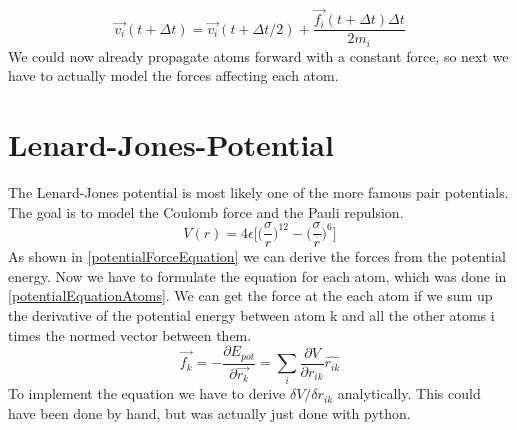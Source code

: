 \begin{equation}
	\label{verletCorrection}
	\overrightarrow{v_{i}}(t+\Delta t) = \overrightarrow{v_{i}}(t+\Delta t/2) +
	\frac{\overrightarrow{f_{i}}(t + \Delta t)\Delta t}{2m_{i}}
\end{equation}
We could now already propagate atoms forward with a constant force, so next we have to actually model the forces affecting each atom.


\section{Lenard-Jones-Potential}
\begin{comment}
- pair potential
\end{comment}
The Lenard-Jones potential is most likely one of the more famous pair potentials. The goal is to model the Coulomb force and the Pauli repulsion. 
\begin{equation}
	V(r) = 4\epsilon\bigg[\Big(\frac{\sigma}{r}\Big)^{12}- \Big(\frac{\sigma}{r}\Big)^{6} \bigg]
\end{equation}
As shown in \ref{potentialForceEquation} we can derive the forces from the potential energy. Now we have to formulate the equation for each atom, which was done in \ref {potentialEquationAtoms}. We can get the force at the each atom if we sum up the derivative of the potential energy between atom k and all the other atoms i times the normed vector between them. 
\begin{equation}
	\label{potentialEquationAtoms}
	\overrightarrow{f_{k}} = -\frac{\partial E_{pot}}{\partial  \overrightarrow{r_{k}}}=\sum_{i}^{}\frac{\partial V}{\partial r_{ik}} \hat{r_{ik}}
\end{equation}
To implement the equation we have to derive $\delta V/ \delta r_{ik}$ analytically. This could have been done by hand, but was actually just done with python. 
